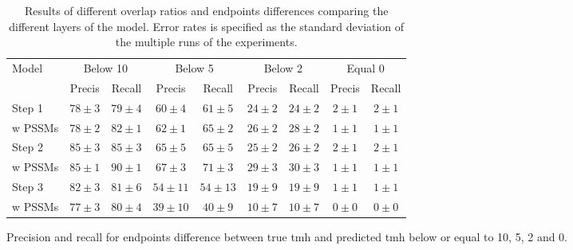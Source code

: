 \begin{table}
	\begin{subtable}[]{\textwidth}
		\begin{tabular}{l|c|c|c|c|c|c|c|c} 
			Model & \multicolumn{2}{|c}{Below 10}& \multicolumn{2}{|c}{Below 5}& \multicolumn{2}{|c}{Below 2}& \multicolumn{2}{|c}{Equal 0}\\ 
			& Precis & Recall & Precis & Recall & Precis & Recall & Precis & Recall \\ \hline 
			Step 1  & $ 78 \pm 3 $ & $ 79 \pm 4 $ & $ 60 \pm 4 $ & $ 61 \pm 5 $ & $ 24 \pm 2 $ & $ 24 \pm 2 $ & $  2 \pm 1 $ & $  2 \pm 1 $ \\
			w PSSMs & $ 78 \pm 2 $ & $ 82 \pm 1 $ & $ 62 \pm 1 $ & $ 65 \pm 2 $ & $ 26 \pm 2 $ & $ 28 \pm 2 $ & $  1 \pm 1 $ & $  1 \pm 1 $ \\
			Step 2  & $ 85 \pm 3 $ & $ 85 \pm 3 $ & $ 65 \pm 5 $ & $ 65 \pm 5 $ & $ 25 \pm 2 $ & $ 26 \pm 2 $ & $  2 \pm 1 $ & $  2 \pm 1 $ \\
			w PSSMs & $ 85 \pm 1 $ & $ 90 \pm 1 $ & $ 67 \pm 3 $ & $ 71 \pm 3 $ & $ 29 \pm 3 $ & $ 30 \pm 3 $ & $  1 \pm 1 $ & $  1 \pm 1 $ \\
			Step 3  & $ 82 \pm 3 $ & $ 81 \pm 6 $ & $ 54 \pm 11$ & $ 54 \pm 13$ & $ 19 \pm 9 $ & $ 19 \pm 9 $ & $  1 \pm 1 $ & $  1 \pm 1 $ \\
			w PSSMs & $ 77 \pm 3 $ & $ 80 \pm 4 $ & $ 39 \pm 10$ & $ 40 \pm 9 $ & $ 10 \pm 7 $ & $ 10 \pm 7 $ & $  0 \pm 0 $ & $  0 \pm 0 $ \\
		\end{tabular}
		\caption{Precision and recall for endpoints difference between true 
			\gls{tmh} and predicted \gls{tmh} below or equal to 10, 5, 2 and 0.}
		\label{tab:endpoint}
	\end{subtable}
	\caption{Results of different overlap ratios and endpoints differences comparing the different layers of the model.
	Error rates is specified as the standard deviation of the multiple runs of the experiments.}
	\label{tab:step_compare}
\end{table}

